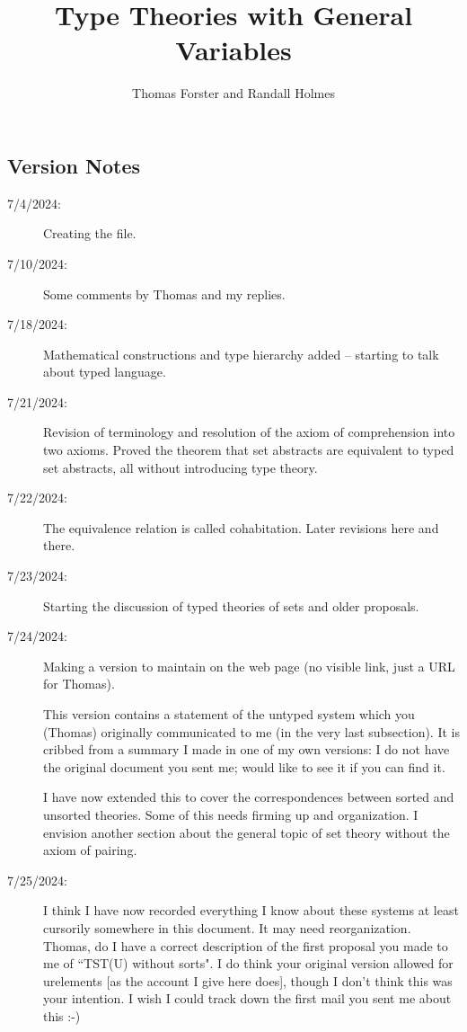\documentclass[12pt]{article}
\title{Type Theories with General Variables}
\author{Thomas Forster and Randall Holmes}
\begin{document}
\maketitle

\tableofcontents

\subsection{Version Notes}

\begin{description}

\item[7/4/2024:]  Creating the file.

\item[7/10/2024:]  Some comments by Thomas and my replies.


\item[7/18/2024:]  Mathematical constructions and type hierarchy added -- starting to talk about typed language.

\item[7/21/2024:]  Revision of terminology and resolution of the axiom of comprehension into two axioms.  Proved the theorem that set abstracts are equivalent to typed set abstracts, all without introducing type theory.

\item[7/22/2024:]  The equivalence relation is called cohabitation.  Later revisions here and there.

\item[7/23/2024:]  Starting the discussion of typed theories of sets and older proposals.

\item[7/24/2024:]  Making a version to maintain on the web page (no visible link, just a URL for Thomas).

This version contains a statement of the untyped system which you (Thomas) originally communicated to me (in the very last subsection).  It is cribbed from a summary I made in one of my own versions:  I do not have the original document you sent me;  would like to see it if you can find it.

I have now extended this to cover the correspondences between sorted and unsorted theories.  Some of this needs firming up and organization.
I envision another section about the general topic of set theory without the axiom of pairing.

\item[7/25/2024:]  I think I have now recorded everything I know about these systems at least cursorily somewhere in this document.  It may need reorganization.
Thomas, do I have a correct description of the first proposal you made to me of ``TST(U) without sorts".  I do think your original version allowed for urelements [as the account I give here does], though I don't think this was your intention.  I wish I could track down the first mail you sent me about this :-)


\end{description}
\end{document}
